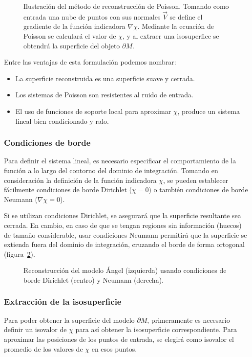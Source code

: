 	\begin{figure}
		\caption{\label{fig:poiss_planteo}Ilustración del método de reconstrucción de Poisson.
		Tomando como entrada una nube de puntos con sus normales $\vec{V}$ se define el gradiente de la función
		indicadora $\nabla \chi$. Mediante la ecuación de Poisson se calculará el valor de $\chi$,
		y al extraer una isosuperfice se obtendrá la superficie del objeto $\partial M$. 
		}
	\end{figure}

	Entre las ventajas de esta formulación podemos nombrar:
	\begin{itemize}
		\item La superficie reconstruida es una superficie suave y cerrada.
		\item Los sistemas de Poisson son resistentes al ruido de entrada.
		\item El uso de funciones de soporte local para aproximar $\chi$,
			produce un sistema lineal bien condicionado y ralo.\cite{Kazhdan:2006:PSR:1281957.1281965}
	\end{itemize}

		\subsubsection{Condiciones de borde}
		Para definir el sistema lineal, es necesario especificar el
		comportamiento de la función a lo largo del contorno del dominio de
		integración.
		Tomando en consideración la definición de la función indicadora $\chi$,
		se pueden establecer fácilmente condiciones de borde Dirichlet ($\chi = 0$)
		o también condiciones de borde Neumann ($\nabla \chi = 0$).

		Si se utilizan condiciones Dirichlet, se asegurará que la superficie resultante sea cerrada.
		En cambio, en caso de que se tengan regiones sin información (huecos) de tamaño
		considerable, usar condiciones Neumann permitirá que la superficie se
		extienda fuera del dominio de integración, cruzando el borde de forma
		ortogonal (figura~\ref{fig:poisson_boundary})\cite{Kazhdan_screenedpoisson}.
		\begin{figure}
			\caption{\label{fig:poisson_boundary}Reconstrucción del modelo Ángel (izquierda) usando condiciones de borde Dirichlet (centro) y Neumann (derecha).}
		\end{figure}


		\subsubsection{Extracción de la isosuperficie}
		Para poder obtener la superficie del modelo $\partial M$, primeramente es necesario
		definir un isovalor de $\chi$ para así obtener la isosuperficie correspondiente.
		Para aproximar las posiciones de los puntos de entrada, se elegirá como isovalor
		el promedio de los valores de $\chi$ en esos puntos.


